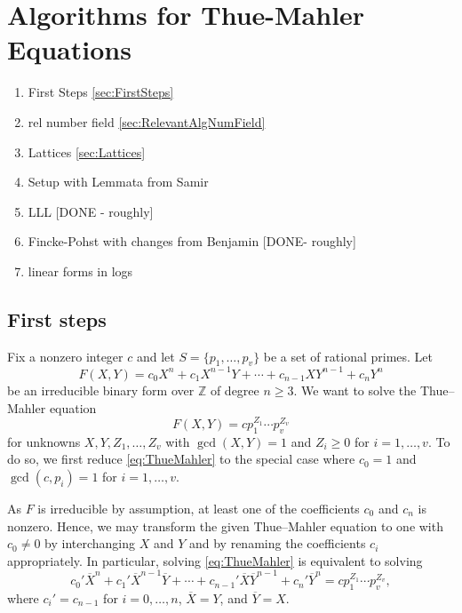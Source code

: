 
\chapter{Algorithms for Thue-Mahler Equations}
\label{ch:AlgorithmsForTM}

\begin{enumerate}
\item First Steps \autoref{sec:FirstSteps}
\item rel number field \autoref{sec:RelevantAlgNumField}
\item Lattices \autoref{sec:Lattices}
\item Setup with Lemmata from Samir
\item LLL [DONE - roughly]
\item Fincke-Pohst with changes from Benjamin [DONE- roughly]
\item linear forms in logs
\end{enumerate}


\section{First steps}
\label{sec:FirstSteps}

Fix a nonzero integer $c$ and let $S=\{p_1,\dotsc,p_v\}$ be a set of rational primes. Let
\[F(X,Y) = c_0 X^n + c_1 X^{n-1}Y + \cdots + c_{n-1}XY^{n-1} + c_nY^n\]
be an irreducible binary form over $\mathbb{Z}$ of degree $n \geq 3$. We want to solve the Thue--Mahler equation
\begin{equation} \label{eq:ThueMahler}
F(X,Y) = c p_1^{Z_1}\cdots p_v^{Z_v}
\end{equation}
for unknowns $X,Y, Z_1, \dots, Z_v$ with $\gcd(X,Y) = 1$ and $Z_i \geq 0$ for $i = 1,\dots, v$. To do so, we first reduce \eqref{eq:ThueMahler} to the special case where $c_0 = 1$ and $\gcd(c,p_i) = 1$ for $i = 1, \dots, v$. 

As $F$ is irreducible by assumption, at least one of the coefficients $c_0$ and $c_n$ is nonzero. Hence, we may transform the given Thue--Mahler equation to one with $c_0 \neq 0$ by interchanging $X$ and $Y$ and by renaming the coefficients $c_i$ appropriately. In particular, solving \eqref{eq:ThueMahler} is equivalent to solving 
\[ c_0' \overline{X}^n + c_1' \overline{X}^{n-1}\overline{Y} + \cdots + c_{n-1}'\overline{X}\overline{Y}^{n-1} + c_n'\overline{Y}^n = c p_1^{Z_1}\cdots p_v^{Z_v},\]
where $c_i' = c_{n-1}$ for $i = 0, \dots, n$, $\overline{X} = Y$, and $\overline{Y} = X$. 

